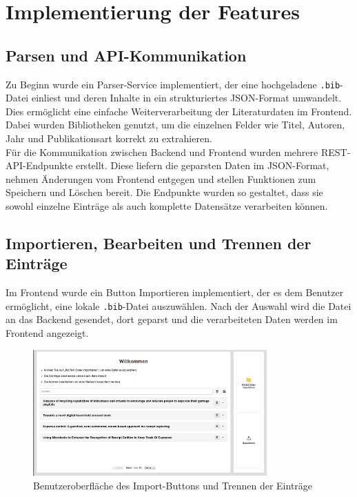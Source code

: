 \section{Implementierung der Features}

\subsection{Parsen und API-Kommunikation}
Zu Beginn wurde ein Parser-Service implementiert, der eine hochgeladene \texttt{.bib}-Datei einliest 
und deren Inhalte in ein strukturiertes JSON-Format umwandelt. Dies ermöglicht eine einfache Weiterverarbeitung 
der Literaturdaten im Frontend. Dabei wurden Bibliotheken genutzt, um die einzelnen Felder wie Titel, Autoren, Jahr
und Publikationsart korrekt zu extrahieren.\\

\noindent Für die Kommunikation zwischen Backend und Frontend wurden mehrere REST-API-Endpunkte erstellt.
Diese liefern die geparsten Daten im JSON-Format, nehmen Änderungen vom Frontend entgegen und
stellen Funktionen zum Speichern und Löschen bereit. Die Endpunkte wurden so gestaltet, dass sie sowohl
einzelne Einträge als auch komplette Datensätze verarbeiten können.

\subsection{Importieren, Bearbeiten und Trennen der Einträge}
Im Frontend wurde ein Button \glqq Importieren\grqq{} implementiert, der es dem Benutzer ermöglicht,
eine lokale \texttt{.bib}-Datei auszuwählen. Nach der Auswahl wird die Datei an das Backend gesendet, 
dort geparst und die verarbeiteten Daten werden im Frontend angezeigt.

\begin{figure}[h]
    \centering
    \includegraphics[width=0.8\textwidth]{Graphics/front.png}
    \caption{Benutzeroberfläche des Import-Buttons und Trennen der Einträge}
    \label{fig:importieren}
\end{figure}

